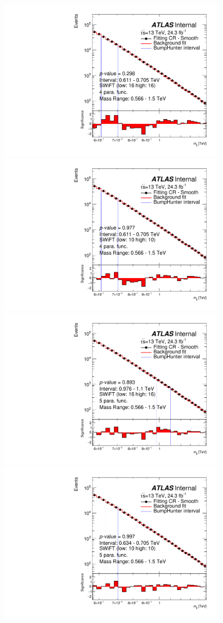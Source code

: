 \begin{figure}[!htb]
\vspace{-0.5em}
\captionsetup[subfigure]{aboveskip=0pt,justification=centering}
\centering
{} {
  \includegraphics[width=0.42\linewidth, angle=0]{figs/Dibjet/LowMass/FitStudy_min566/bhFit_corrFitCR_smooth_4para_low16_high16.pdf}
}
 {
  \includegraphics[width=0.42\linewidth, angle=0]{figs/Dibjet/LowMass/FitStudy_min566/bhFit_corrFitCR_smooth_4para_low10_high10.pdf}
}
 {
  \includegraphics[width=0.42\linewidth, angle=0]{figs/Dibjet/LowMass/FitStudy_min566/bhFit_corrFitCR_smooth_5para_low16_high16.pdf}
}
 {
  \includegraphics[width=0.42\linewidth, angle=0]{figs/Dibjet/LowMass/FitStudy_min566/bhFit_corrFitCR_smooth_5para_low10_high10.pdf}
}


\end{figure}
